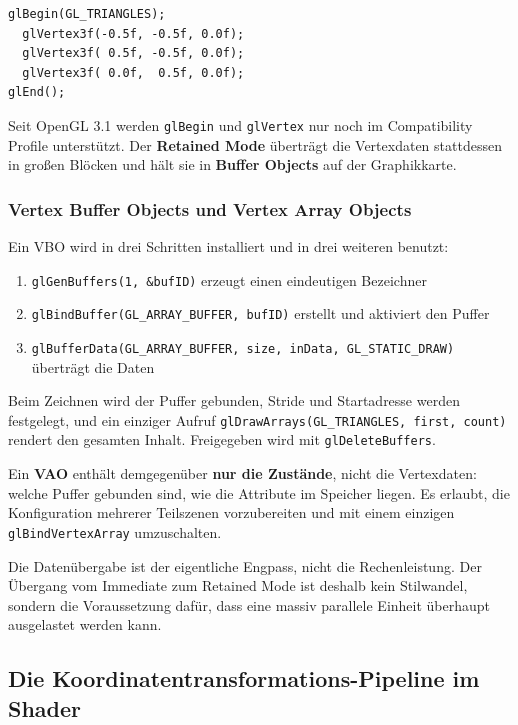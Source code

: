 \documentclass[12pt, a4paper]{article}
\begin{document}
\begin{lstlisting}
glBegin(GL_TRIANGLES);
  glVertex3f(-0.5f, -0.5f, 0.0f);
  glVertex3f( 0.5f, -0.5f, 0.0f);
  glVertex3f( 0.0f,  0.5f, 0.0f);
glEnd();
\end{lstlisting}

Seit OpenGL 3.1 werden \texttt{glBegin} und \texttt{glVertex} nur noch im Compatibility
Profile unterstützt. Der \textbf{Retained Mode} überträgt die Vertexdaten stattdessen in
großen Blöcken und hält sie in \textbf{Buffer Objects} auf der Graphikkarte.

\subsubsection*{Vertex Buffer Objects und Vertex Array Objects}

Ein VBO wird in drei Schritten installiert und in drei weiteren benutzt:

\begin{enumerate}
  \item \texttt{glGenBuffers(1, \&bufID)} erzeugt einen eindeutigen Bezeichner
  \item \texttt{glBindBuffer(GL\_ARRAY\_BUFFER, bufID)} erstellt und aktiviert den Puffer
  \item \texttt{glBufferData(GL\_ARRAY\_BUFFER, size, inData, GL\_STATIC\_DRAW)} überträgt die Daten
\end{enumerate}

Beim Zeichnen wird der Puffer gebunden, Stride und Startadresse werden festgelegt, und
ein einziger Aufruf \texttt{glDrawArrays(GL\_TRIANGLES, first, count)} rendert den
gesamten Inhalt. Freigegeben wird mit \texttt{glDeleteBuffers}.

Ein \textbf{VAO} enthält demgegenüber \textbf{nur die Zustände}, nicht die Vertexdaten:
welche Puffer gebunden sind, wie die Attribute im Speicher liegen. Es erlaubt, die
Konfiguration mehrerer Teilszenen vorzubereiten und mit einem einzigen
\texttt{glBindVertexArray} umzuschalten.

\begin{notebox}
Die Datenübergabe ist der eigentliche Engpass, nicht die Rechenleistung. Der Übergang
vom Immediate zum Retained Mode ist deshalb kein Stilwandel, sondern die
Voraussetzung dafür, dass eine massiv parallele Einheit überhaupt ausgelastet werden
kann.
\end{notebox}

\subsection{Die Koordinatentransformations-Pipeline im Shader}
\end{document}
